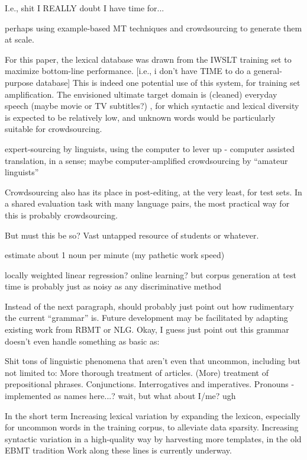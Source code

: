 I.e., shit I REALLY doubt I have time for...


perhaps using example-based MT techniques  and crowdsourcing to generate them at scale.

For this paper, the lexical database was drawn from the IWSLT training set to maximize bottom-line performance.
[i.e., i don't have TIME to do a general-purpose database]
This is indeed one potential use of this system, for training set amplification.
The envisioned ultimate target domain is (cleaned) everyday speech (maybe movie or TV subtitles?) , for which syntactic and lexical diversity is expected to be relatively low, and unknown words would be particularly suitable for crowdsourcing.

expert-sourcing by linguists, using the computer to lever up - computer assisted translation, in a sense; maybe computer-amplified
crowdsourcing by ``amateur linguists''

Crowdsourcing also has its place in post-editing, at the very least, for test sets.
In a shared evaluation task with many language pairs, the most practical way for this is probably crowdsourcing.

But must this be so? Vast untapped resource of students or whatever.

estimate about 1 noun per minute (my pathetic work speed)

locally weighted linear regression? online learning?
but corpus generation at test time is probably just as noisy as any discriminative method

Instead of the next paragraph, should probably just point out how rudimentary the current ``grammar'' is. 
Future development may be facilitated by adapting existing work from RBMT or NLG. 
Okay, I guess just point out this grammar doesn't even handle something as basic as:

Shit tons of linguistic phenomena that aren't even that uncommon, including but not limited to:
More thorough treatment of articles.
(More) treatment of prepositional phrases.
Conjunctions.
Interrogatives and imperatives.
Pronouns - implemented as names here...? wait, but what about I/me? ugh

In the short term
Increasing lexical variation by expanding the lexicon, especially for uncommon words in the training corpus, to alleviate data sparsity.
Increasing syntactic variation in a high-quality way by harvesting more templates, in the old EBMT tradition
Work along these lines is currently underway.


